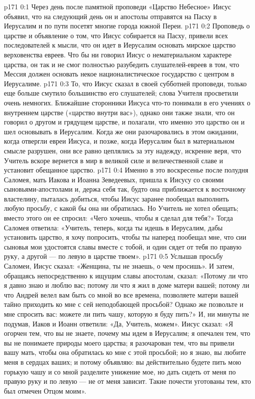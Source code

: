 \author{Комиссия срединников}
\vs p171 0:1 Через день после памятной проповеди «Царство Небесное» Иисус объявил, что на следующий день он и апостолы отправятся на Пасху в Иерусалим и по пути посетят многие города южной Переи.
\vs p171 0:2 Проповедь о царстве и объявление о том, что Иисус собирается на Пасху, привели всех последователей к мысли, что он идет в Иерусалим основать мирское царство верховенства евреев. Что бы ни говорил Иисус о нематериальном характере царства, он так и не смог полностью разубедить слушателей\hyp{}евреев в том, что Мессия должен основать некое националистическое государство с центром в Иерусалиме.
\vs p171 0:3 То, что Иисус сказал в своей субботней проповеди, только еще больше смутило большинство его слушателей; слова Учителя просветили очень немногих. Ближайшие сторонники Иисуса что\hyp{}то понимали в его учениях о внутреннем царстве («царство внутри вас»), однако они также знали, что он говорил о другом и грядущем царстве, и полагали, что именно это царство он и шел основывать в Иерусалим. Когда же они разочаровались в этом ожидании, когда отвергли евреи Иисуса, и позже, когда Иерусалим был в материальном смысле разрушен, они все равно цеплялись за эту надежду, искренне веря, что Учитель вскоре вернется в мир в великой силе и величественной славе и установит обещанное царство.
\vs p171 0:4 \pc Именно в это воскресенье после полудня Саломея, мать Иакова и Иоанна Зеведеевых, пришла к Иисусу со своими сыновьями\hyp{}апостолами и, держа себя так, будто она приближается к восточному властелину, пыталась добиться, чтобы Иисус заранее пообещал выполнить любую просьбу, с какой бы она ни обратилась. Но Учитель не хотел обещать; вместо этого он ее спросил: «Чего хочешь, чтобы я сделал для тебя?» Тогда Саломея ответила: «Учитель, теперь, когда ты идешь в Иерусалим, дабы установить царство, я хочу попросить, чтобы ты наперед пообещал мне, что сии сыновья мои удостоятся славы вместе с тобой, и один сядет от тебя по правую руку, а другой --- по левую в царстве твоем».
\vs p171 0:5 Услышав просьбу Саломеи, Иисус сказал: «Женщина, ты не знаешь, о чем просишь». И затем, обращаясь непосредственно к ищущим славы апостолам, сказал: «Потому ли что я давно знаю и люблю вас; потому ли что я жил в доме матери вашей; потому ли что Андрей велел вам быть со мной во все времена, позволяете матери вашей тайно приходить ко мне с сей неподобающей просьбой? Однако же позвольте и мне спросить вас: можете ли пить чашу, которую я буду пить?» И, ни минуты не подумав, Иаков и Иоанн ответили: «Да, Учитель, можем». Иисус сказал: «Я огорчен тем, что вы не знаете, почему мы идем в Иерусалим; я опечален тем, что вы не понимаете природы моего царства; я разочарован тем, что вы привели вашу мать, чтобы она обратилась ко мне с этой просьбой; но я знаю, вы любите меня в сердцах ваших; и потому объявляю: вы действительно будете пить мою горькую чашу и со мной разделите унижение мое, но дать сидеть от меня по правую руку и по левую --- не от меня зависит. Такие почести уготованы тем, кто был отмечен Отцом моим».
